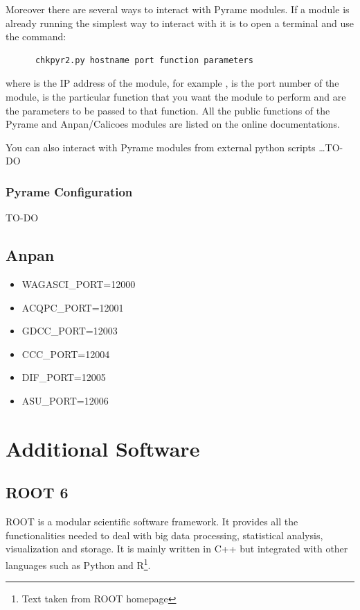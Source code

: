 Moreover there are several ways to interact with Pyrame modules. If a
module is already running the simplest way to interact with it is to
open a terminal and use the command:
\begin{lstlisting}
      chkpyr2.py hostname port function parameters
\end{lstlisting}
where  is the IP address of the module, for
example ,  is the port number
of the module,  is the particular function that
you want the module to perform and  are the
parameters to be passed to that function. All the public functions of
the Pyrame and Anpan/Calicoes modules are listed on the online
documentations.

You can also interact with Pyrame modules from external python scripts
\dots TO-DO

\subsection{Pyrame Configuration}\label{sec:pyrame-configuration}

TO-DO


\section{Anpan}
\begin{itemize}
\item WAGASCI\_PORT=12000
\item ACQPC\_PORT=12001
\item GDCC\_PORT=12003
\item CCC\_PORT=12004
\item DIF\_PORT=12005
\item ASU\_PORT=12006
\end{itemize}

\chapter{Additional Software}
\section{ROOT 6}
ROOT is a modular scientific software framework. It provides all the
functionalities needed to deal with big data processing, statistical
analysis, visualization and storage. It is mainly written in C++ but
integrated with other languages such as Python and R\footnote{Text
  taken from ROOT homepage}.

